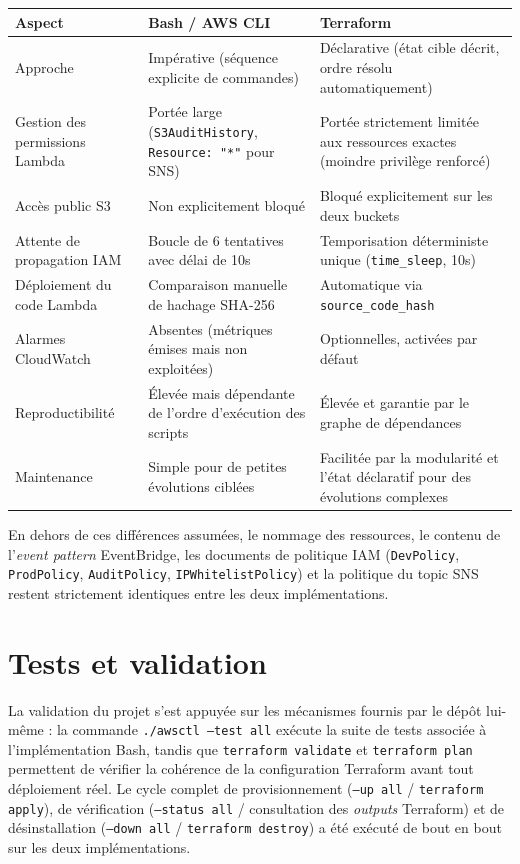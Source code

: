 \documentclass[11pt,a4paper]{report}
\begin{document}
\begin{center}
\renewcommand{\arraystretch}{1.35}
{\small
\begin{tabularx}{\linewidth}{X X X}
\toprule
\textbf{Aspect} & \textbf{Bash / AWS CLI} & \textbf{Terraform} \\
\midrule
Approche & Impérative (séquence explicite de commandes) & Déclarative (état cible décrit, ordre résolu automatiquement) \\
Gestion des permissions Lambda & Portée large (\texttt{S3AuditHistory}, \texttt{Resource: "*"} pour SNS) & Portée strictement limitée aux ressources exactes (moindre privilège renforcé) \\
Accès public S3 & Non explicitement bloqué & Bloqué explicitement sur les deux buckets \\
Attente de propagation IAM & Boucle de 6 tentatives avec délai de 10s & Temporisation déterministe unique (\texttt{time\_sleep}, 10s) \\
Déploiement du code Lambda & Comparaison manuelle de hachage SHA-256 & Automatique via \texttt{source\_code\_hash} \\
Alarmes CloudWatch & Absentes (métriques émises mais non exploitées) & Optionnelles, activées par défaut \\
Reproductibilité & Élevée mais dépendante de l'ordre d'exécution des scripts & Élevée et garantie par le graphe de dépendances \\
Maintenance & Simple pour de petites évolutions ciblées & Facilitée par la modularité et l'état déclaratif pour des évolutions complexes \\
\bottomrule
\end{tabularx}
}
\end{center}

En dehors de ces différences assumées, le nommage des ressources, le contenu de l'\textit{event pattern} EventBridge, les documents de politique IAM (\texttt{DevPolicy}, \texttt{ProdPolicy}, \texttt{AuditPolicy}, \texttt{IPWhitelistPolicy}) et la politique du topic SNS restent strictement identiques entre les deux implémentations.

\section{Tests et validation}

La validation du projet s'est appuyée sur les mécanismes fournis par le dépôt lui-même : la commande \texttt{./awsctl --test all} exécute la suite de tests associée à l'implémentation Bash, tandis que \texttt{terraform validate} et \texttt{terraform plan} permettent de vérifier la cohérence de la configuration Terraform avant tout déploiement réel. Le cycle complet de provisionnement (\texttt{--up all} / \texttt{terraform apply}), de vérification (\texttt{--status all} / consultation des \textit{outputs} Terraform) et de désinstallation (\texttt{--down all} / \texttt{terraform destroy}) a été exécuté de bout en bout sur les deux implémentations.
\end{document}
